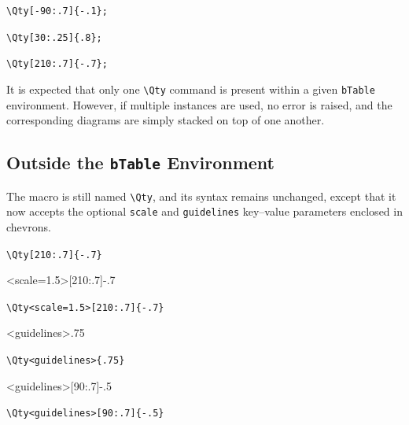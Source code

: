 \documentclass[11pt,a4paper]{ltxdoc}
\def\bluett#1{{\color{blue}\texttt{#1}}}
\begin{document}
\begin{minipage}{.33\linewidth}\centering
    \par
    {\color{blue}\verb|\Qty[-90:.7]{-.1};|}
\end{minipage}
\begin{minipage}{.34\linewidth}\centering
    \par
    {\color{blue}\verb|\Qty[30:.25]{.8};|}
\end{minipage}
\begin{minipage}{.33\linewidth}\centering
    \par
    {\color{blue}\verb|\Qty[210:.7]{-.7};|}
\end{minipage}\bigskip

It is expected that only one \bluett{\textbackslash Qty} command is present within a given \bluett{bTable} environment. However, if multiple instances are used, no error is raised, and the corresponding diagrams are simply stacked on top of one another.

\subsection{Outside the \bluett{bTable} Environment}

The macro is still named \bluett{\textbackslash Qty}, and its syntax remains unchanged, except that it now accepts the optional \bluett{scale} and \bluett{guidelines} key–value parameters enclosed in chevrons.

\begin{minipage}{.5\linewidth}\centering
    \par
    {\color{blue}\verb|\Qty[210:.7]{-.7}|}
\end{minipage}
\begin{minipage}{.5\linewidth}\centering
    \Qty<scale=1.5>[210:.7]{-.7}
    \par
    {\color{blue}\verb|\Qty<scale=1.5>[210:.7]{-.7}|}
\end{minipage}
\bigskip

\begin{minipage}{.5\linewidth}\centering
    \Qty<guidelines>{.75}
    \par
    {\color{blue}\verb|\Qty<guidelines>{.75}|}
\end{minipage}
\begin{minipage}{.5\linewidth}\centering
    \Qty<guidelines>[90:.7]{-.5}
    \par
    {\color{blue}\verb|\Qty<guidelines>[90:.7]{-.5}|}
\end{minipage}
\end{document}

